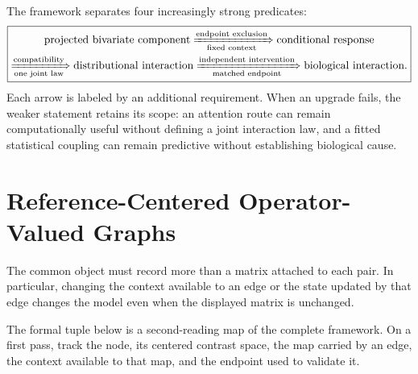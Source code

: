 \documentclass[10pt]{article}
\theoremstyle{definition}
\theoremstyle{remark}
\newcommand{\BookPart}[1]{}
\newcommand{\BookChapter}[1]{\section{#1}}
\newcommand{\BookInsert}[1]{}
\newcommand{\BookChapterLabel}[1]{}
\begin{document}
The framework separates four increasingly strong predicates:
\begin{equation}
\boxed{
\begin{gathered}
\text{projected bivariate component}
\xRightarrow[\text{fixed context}]{\text{endpoint exclusion}}
\text{conditional response}\\
\xRightarrow[\text{one joint law}]{\text{compatibility}}
\text{distributional interaction}
\xRightarrow[\text{matched endpoint}]{\text{independent intervention}}
\text{biological interaction}.
\end{gathered}}
\label{eq:claim-ladder}
\end{equation}
Each arrow is labeled by an additional requirement.  When an upgrade fails, the weaker statement
retains its scope: an attention route can remain computationally
useful without defining a joint interaction law, and a fitted statistical coupling can remain
predictive without establishing biological cause.

\fi
\BookPart{Operator Geometry of Sequence Interactions}
\BookChapter{Reference-Centered Operator-Valued Graphs}
\BookChapterLabel{chap:book-reference-geometry}
\BookInsert{chapters/03_opening}
\BookInsert{chapters/03_three_state_example}
\BookInsert{chapters/03_categorical_geometry_primer}

The common object must record more than a matrix attached to each pair.  In particular, changing
the context available to an edge or the state updated by that edge changes the model even when the
displayed matrix is unchanged.

\ifdefined\BOOKMODE
The formal tuple below is a second-reading map of the complete framework.  On a first pass, track
the node, its centered contrast space, the map carried by an edge, the context available to that
map, and the endpoint used to validate it.
\fi
\end{document}
